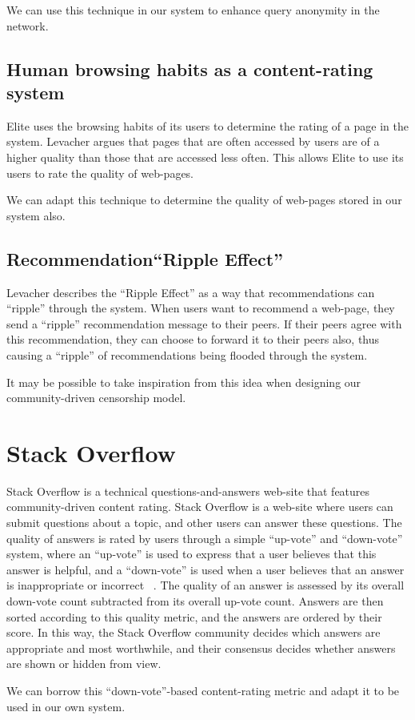 We can use this technique in our system to enhance query anonymity in the network.

\subsection{Human browsing habits as a content-rating system}

Elite uses the browsing habits of its users to determine the rating of a page in the system. Levacher argues that
pages that are often accessed by users are of a higher quality than those that are accessed less often. This
allows Elite to use its users to rate the quality of web-pages.

We can adapt this technique to determine the quality of web-pages stored in our system also.

\subsection{Recommendation``Ripple Effect''}

Levacher describes the ``Ripple Effect'' as a way that recommendations can ``ripple'' through the system. When users
want to recommend a web-page, they send a ``ripple'' recommendation message to their peers. If their peers agree with
this recommendation, they can choose to forward it to their peers also, thus causing a ``ripple'' of recommendations
being flooded through the system.

It may be possible to take inspiration from this idea when designing our community-driven censorship model.

\section{Stack Overflow}

Stack Overflow is a technical questions-and-answers web-site that features
community-driven content rating. Stack Overflow is a web-site where users can submit
questions about a topic, and other users can answer these questions. The quality
of answers is rated by users through a simple ``up-vote'' and ``down-vote'' system, where an
``up-vote'' is used to express that a user believes that this answer is helpful,
and a ``down-vote'' is used when a user believes that an answer is inappropriate or incorrect
~\cite{stackoverflow}.
The quality of an answer is assessed by its overall down-vote count subtracted
from its overall up-vote count. Answers are then sorted according to this
quality metric, and the answers are ordered by their score. In this way, the
Stack Overflow community decides which answers are appropriate and most worthwhile,
and their consensus decides whether answers are shown or hidden from view.

We can borrow this ``down-vote''-based content-rating metric and adapt it to be used in our own system.
